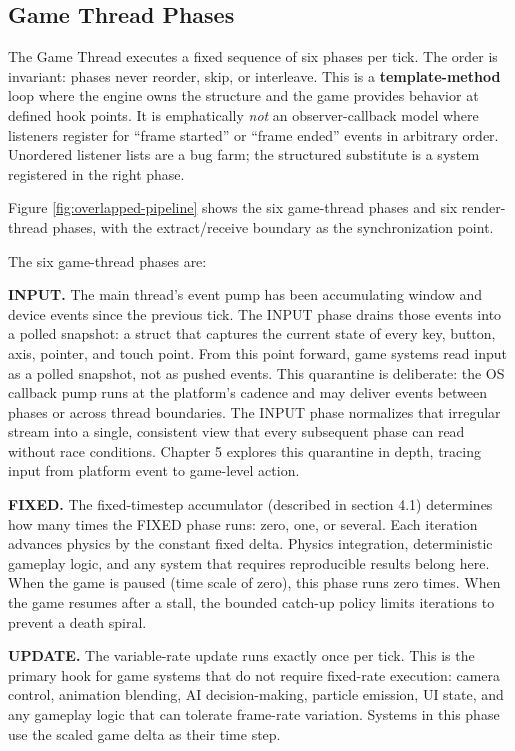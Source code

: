 \documentclass[
  11pt,
  letterpaper,
  DIV=11,
  numbers=noendperiod,
  twoside,
  open=right]{scrreprt}
\begin{document}
\subsection{Game Thread Phases}\label{game-thread-phases}

The Game Thread executes a fixed sequence of six phases per tick. The
order is invariant: phases never reorder, skip, or interleave. This is a
\textbf{template-method} loop where the engine owns the structure and
the game provides behavior at defined hook points. It is emphatically
\emph{not} an observer-callback model where listeners register for
``frame started'' or ``frame ended'' events in arbitrary order.
Unordered listener lists are a bug farm; the structured substitute is a
system registered in the right phase.

Figure \ref{fig:overlapped-pipeline} shows the six game-thread phases
and six render-thread phases, with the extract/receive boundary as the
synchronization point.



The six game-thread phases are:

\textbf{INPUT.} The main thread's event pump has been accumulating
window and device events since the previous tick. The INPUT phase drains
those events into a polled snapshot: a struct that captures the current
state of every key, button, axis, pointer, and touch point. From this
point forward, game systems read input as a polled snapshot, not as
pushed events. This quarantine is deliberate: the OS callback pump runs
at the platform's cadence and may deliver events between phases or
across thread boundaries. The INPUT phase normalizes that irregular
stream into a single, consistent view that every subsequent phase can
read without race conditions. Chapter 5 explores this quarantine in
depth, tracing input from platform event to game-level action.

\textbf{FIXED.} The fixed-timestep accumulator (described in section
4.1) determines how many times the FIXED phase runs: zero, one, or
several. Each iteration advances physics by the constant fixed delta.
Physics integration, deterministic gameplay logic, and any system that
requires reproducible results belong here. When the game is paused (time
scale of zero), this phase runs zero times. When the game resumes after
a stall, the bounded catch-up policy limits iterations to prevent a
death spiral.

\textbf{UPDATE.} The variable-rate update runs exactly once per tick.
This is the primary hook for game systems that do not require fixed-rate
execution: camera control, animation blending, AI decision-making,
particle emission, UI state, and any gameplay logic that can tolerate
frame-rate variation. Systems in this phase use the scaled game delta as
their time step.
\end{document}
